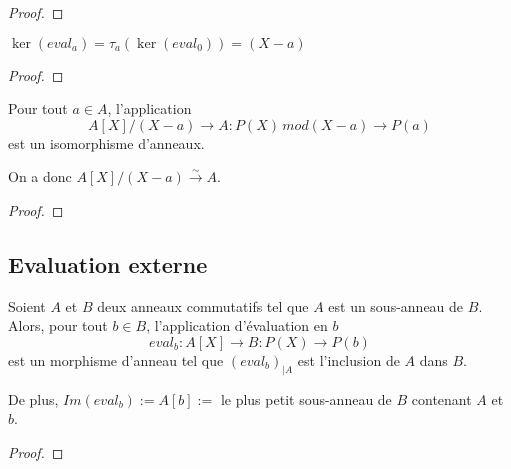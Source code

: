 \ifdefined\outputproof
\begin{proof}

\end{proof}
\fi

\begin{corollary}
	$\ker(eval_{a}) = \tau_{a}(\ker(eval_{0})) = (X - a)$
\end{corollary}

\ifdefined\outputproof
\begin{proof}

\end{proof}
\fi

\begin{proposition}
	Pour tout $a \in A$, l'application
	\begin{equation}
		A[X] / (X - a) \rightarrow A : P(X) \, mod(X - a) \rightarrow P(a)
	\end{equation}
	est un isomorphisme d'anneaux.

	On a donc $A[X] / (X - a) \xrightarrow{\sim} A$.
\end{proposition}

\ifdefined\outputproof
\begin{proof}

\end{proof}
\fi

\subsection{Evaluation externe}

\begin{proposition}
	Soient $A$ et $B$ deux anneaux commutatifs tel que $A$ est un sous-anneau de
	$B$. Alors, pour tout $b \in B$, l'application d'évaluation en $b$
	\begin{equation}
		eval_{b} : A[X] \rightarrow B : P(X) \rightarrow P(b)
	\end{equation}
	est un morphisme d'anneau tel que ${(eval_{b})}_{|A}$ est
	l'inclusion de $A$ dans $B$.

	De plus, $Im(eval_{b}) := A[b] := $ le plus petit sous-anneau de $B$
	contenant $A$ et $b$. %
\end{proposition}

\ifdefined\outputproof
\begin{proof}

\end{proof}
\fi



